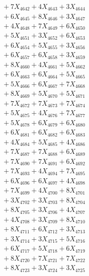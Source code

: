 \documentclass[a4paper,10pt]{article}
\begin{document}
{\begin{align}
&\;  + 7 X_{4642} + 4 X_{4643} + 3 X_{4644} \\[0.3ex]
&\;  + 6 X_{4645} + 8 X_{4646} + 3 X_{4647} \\[0.3ex]
&\;  + 4 X_{4648} + 7 X_{4649} + 6 X_{4650} \\[0.3ex]
&\;  + 5 X_{4651} + 3 X_{4652} + 6 X_{4653} \\[0.3ex]
&\;  + 6 X_{4654} + 5 X_{4655} + 3 X_{4656} \\[0.3ex]
&\;  + 6 X_{4657} + 6 X_{4658} + 3 X_{4659} \\[0.5ex]\allowbreak
&\;  + 8 X_{4660} + 4 X_{4661} + 5 X_{4662} \\[0.3ex]
&\;  + 6 X_{4663} + 6 X_{4664} + 5 X_{4665} \\[0.3ex]
&\;  + 5 X_{4666} + 6 X_{4667} + 7 X_{4668} \\[0.3ex]
&\;  + 8 X_{4669} + 5 X_{4670} + 5 X_{4671} \\[0.3ex]
&\;  + 7 X_{4672} + 7 X_{4673} + 7 X_{4674} \\[0.3ex]
&\;  + 5 X_{4675} + 4 X_{4676} + 7 X_{4677} \\[0.3ex]
&\;  + 5 X_{4678} + 6 X_{4679} + 6 X_{4680} \\[0.3ex]
&\;  + 6 X_{4681} + 6 X_{4682} + 6 X_{4683} \\[0.3ex]
&\;  + 4 X_{4684} + 5 X_{4685} + 4 X_{4686} \\[0.3ex]
&\;  + 7 X_{4687} + 7 X_{4688} + 6 X_{4689} \\[0.5ex]\allowbreak
&\;  + 7 X_{4690} + 7 X_{4691} + 6 X_{4692} \\[0.3ex]
&\;  + 7 X_{4693} + 4 X_{4694} + 7 X_{4695} \\[0.3ex]
&\;  + 6 X_{4696} + 6 X_{4697} + 4 X_{4698} \\[0.3ex]
&\;  + 7 X_{4699} + 4 X_{4700} + 8 X_{4701} \\[0.3ex]
&\;  + 3 X_{4702} + 3 X_{4703} + 8 X_{4704} \\[0.3ex]
&\;  + 8 X_{4705} + 3 X_{4706} + 4 X_{4707} \\[0.3ex]
&\;  + 4 X_{4708} + 3 X_{4709} + 8 X_{4710} \\[0.3ex]
&\;  + 8 X_{4711} + 6 X_{4712} + 3 X_{4713} \\[0.3ex]
&\;  + 3 X_{4714} + 3 X_{4715} + 5 X_{4716} \\[0.3ex]
&\;  + 6 X_{4717} + 5 X_{4718} + 6 X_{4719} \\[0.5ex]\allowbreak
&\;  + 8 X_{4720} + 7 X_{4721} + 7 X_{4722} \\[0.3ex]
&\;  + 8 X_{4723} + 3 X_{4724} + 3 X_{4725} \\[0.3ex]

\end{align}}
\end{document}
